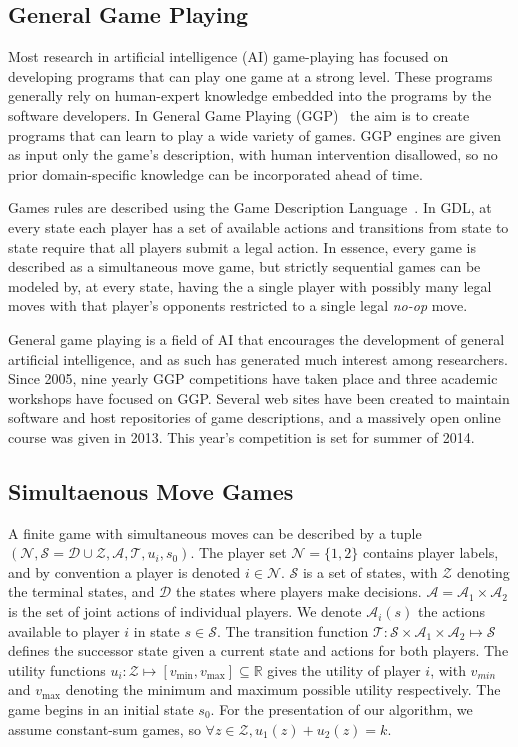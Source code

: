 \documentclass[conference]{IEEEtran}
\newcommand{\cA}{\mathcal{A}}
\newcommand{\cD}{\mathcal{D}}
\newcommand{\cN}{\mathcal{N}}
\newcommand{\cS}{\mathcal{S}}
\newcommand{\cT}{\mathcal{T}}
\newcommand{\cZ}{\mathcal{Z}}
\begin{document}
\subsection{General Game Playing}

Most research in artificial intelligence (AI) game-playing has focused on developing programs that can play one
game at a strong level. These programs 
generally rely on human-expert knowledge embedded into the programs by the software developers. In General Game Playing 
(GGP)~\cite{Genesereth05GGP} the aim is to create programs that can learn to play a wide variety of games. 
GGP engines are given as input only the game's description, with
human intervention disallowed, so no prior domain-specific knowledge can be incorporated ahead of time.

Games rules are described using the Game Description Language~\cite{Love08GDL}. In GDL, at every state each player has 
a set of available actions and transitions from state to state require that all players submit a legal action. In essence, 
every game is described as a simultaneous move game, but strictly sequential games can be modeled by, at every state, 
having the a single player with possibly many legal moves with that player's opponents restricted to a single legal 
\textit{no-op} move. 
 
General game playing is a field of AI that encourages the development of general artificial intelligence, and as such
has generated much interest among researchers. 
Since 2005, nine yearly GGP competitions have taken place and three academic workshops have focused on GGP. 
Several web sites have been created to maintain software and host repositories of game descriptions, and 
a massively open online course was given in 2013. This year's competition is set for summer of 2014. 

\subsection{Simultaenous Move Games}

A finite game with simultaneous moves can be described by a tuple 
$(\cN, \cS = \cD \cup \cZ, \cA, \cT, u_i, s_0)$. The player set $\cN = \{ 1, 2 \}$ contains player 
labels, and by convention a player is denoted $i \in \cN$.
$\cS$ is a set of states, with $\cZ$ denoting the terminal states, and $\cD$ the states where players make decisions.
$\cA = \cA_1 \times \cA_2$ is the set of joint actions of individual players. We denote $\cA_i(s)$ the actions available 
to player $i$ in state $s \in \cS$. The 
transition function $\cT : \cS \times \cA_1 \times \cA_2 \mapsto \cS$ defines the successor state given a current 
state and actions for both players. The utility functions 
$u_i : \cZ \mapsto [v_{\min}, v_{\max}] \subseteq \mathbb{R}$ gives the utility of player $i$, with 
$v_{min}$ and $v_{\max}$ denoting the minimum and maximum possible utility respectively. 
The game begins in an initial state $s_0$. For the presentation of our algorithm, we assume constant-sum games, so
$\forall z \in \cZ, u_1(z) + u_2(z) = k$. 
\end{document}
